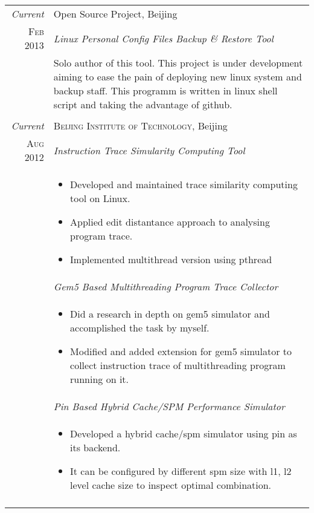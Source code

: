 \documentclass[a4paper,10pt]{article} %
\begin{document}
\begin{tabular}{r|p{11cm}}

\emph{Current} &  Open Source Project, Beijing\smallskip\\
\textsc{Feb 2013} & \emph{Linux Personal Config Files Backup \& Restore Tool}\\ 
& \footnotesize{Solo author of this tool. This project is under development aiming to ease the pain of deploying new linux system and backup staff. This programm is written in linux shell script and taking the advantage of github.}\\
\multicolumn{2}{c}{} \\
\emph{Current} &  \textsc{Beijing Institute of Technology}, Beijing \smallskip\\
\textsc{Aug 2012} & \emph{Instruction Trace Simularity Computing Tool}\\ 
& \footnotesize{
\begin{itemize}
\item Developed and maintained trace similarity computing tool on Linux.
\item Applied edit distantance approach to analysing program trace.
\item Implemented multithread version using pthread
\end{itemize}
}\smallskip\\
& \emph{Gem5 Based Multithreading Program Trace Collector}\smallskip\\
& \footnotesize{
\begin{itemize}
\item Did a research in depth on gem5 simulator and accomplished the task by myself.
\item Modified and added extension for gem5 simulator to collect instruction trace of multithreading program running on it.
\end{itemize}
}\smallskip\\
& \emph{Pin Based Hybrid Cache/SPM Performance Simulator}\\
& \footnotesize{
\begin{itemize}
\item Developed a hybrid cache/spm simulator using pin as its backend. 
\item It can be configured by different spm size with l1, l2 level cache size to inspect optimal combination. 
\end{itemize}
}\\
\multicolumn{2}{c}{} \\


\end{tabular}
\end{document}
